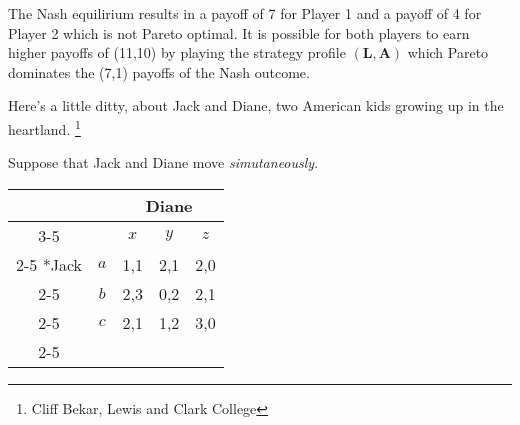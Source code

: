 \documentclass[addpoints]{exam}
\begin{document}
\begin{questions}
\begin{parts}
  \begin{solution}
    The Nash equilirium results in a payoff of 7 for Player 1 and a payoff of 4 for Player 2 which is not Pareto optimal.
    It is possible for both players to earn higher payoffs of (11,10) by playing the strategy profile $\mathbf{(L,A)}$
    which Pareto dominates the (7,1) payoffs of the Nash outcome.
  \end{solution}
\end{parts}

\newpage

\question
Here's a little ditty, about Jack and Diane,
two American kids growing up in the heartland.
\footnote{Cliff Bekar, Lewis and Clark College}

Suppose that Jack and Diane move \textit{simutaneously}.

  \begin{table}[h!]
    \centering
    \setlength{\extrarowheight}{2pt}
    \begin{tabular}{*{5}{c|}}
      \multicolumn{2}{c}{} & \multicolumn{3}{c}{Diane} \\\cline{3-5}
      \multicolumn{1}{c}{} &     & $x$ & $y$ & $z$ \\\cline{2-5}
      \multirow{3}*{Jack}  & $a$ & 1,1 & 2,1 & 2,0 \\\cline{2-5}
                           & $b$ & 2,3 & 0,2 & 2,1 \\\cline{2-5}
                           & $c$ & 2,1 & 1,2 & 3,0 \\\cline{2-5}
    \end{tabular}
  \end{table}

\end{questions}
\end{document}
